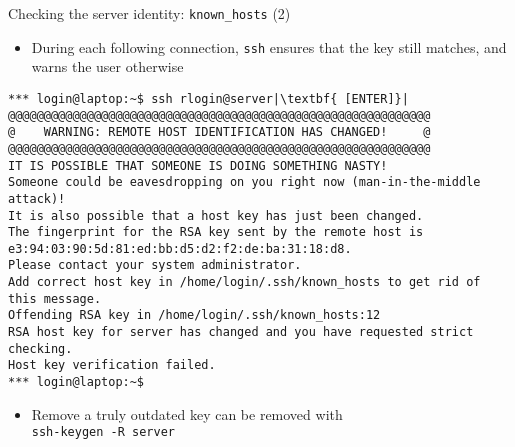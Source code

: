 \documentclass[11pt,final,usepdftitle=false]{beamer}
\begin{document}
\begin{frame}[fragile]{Checking the server identity: \texttt{known\_hosts} (2)}
\begin{itemize}
\item During each following connection, \texttt{ssh} ensures that the key still matches, and warns the user otherwise
\end{itemize}
\begin{lstlisting}[basicstyle=\ttfamily\ssmall,escapeinside={||}]
*** login@laptop:~$ ssh rlogin@server|\textbf{ [ENTER]}|
@@@@@@@@@@@@@@@@@@@@@@@@@@@@@@@@@@@@@@@@@@@@@@@@@@@@@@@@@@@
@    WARNING: REMOTE HOST IDENTIFICATION HAS CHANGED!     @
@@@@@@@@@@@@@@@@@@@@@@@@@@@@@@@@@@@@@@@@@@@@@@@@@@@@@@@@@@@
IT IS POSSIBLE THAT SOMEONE IS DOING SOMETHING NASTY!
Someone could be eavesdropping on you right now (man-in-the-middle attack)!
It is also possible that a host key has just been changed.
The fingerprint for the RSA key sent by the remote host is
e3:94:03:90:5d:81:ed:bb:d5:d2:f2:de:ba:31:18:d8.
Please contact your system administrator.
Add correct host key in /home/login/.ssh/known_hosts to get rid of this message.
Offending RSA key in /home/login/.ssh/known_hosts:12
RSA host key for server has changed and you have requested strict checking.
Host key verification failed.
*** login@laptop:~$ 
\end{lstlisting}
\begin{itemize}
	\item Remove a truly outdated key can be removed with\\ \texttt{ssh-keygen -R server}
\end{itemize}
\end{frame}
\end{document}
